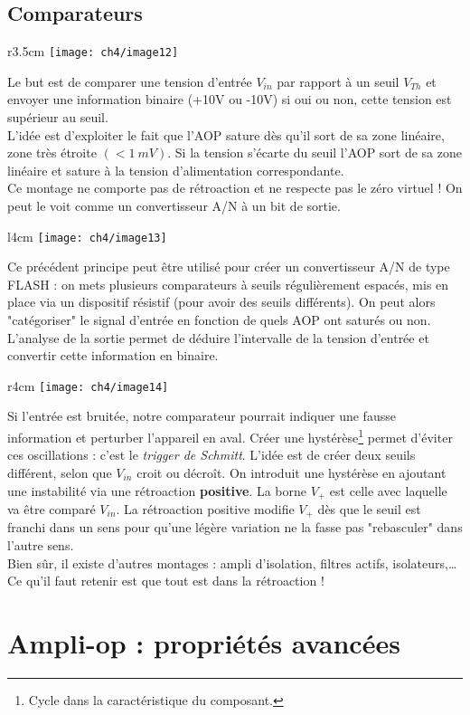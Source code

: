 	\subsection{Comparateurs}
	\begin{wrapfigure}[9]{r}{3.5cm}
	\vspace{-0.5cm}
	\texttt{[image: ch4/image12]}
	\end{wrapfigure}
	Le but est de comparer une tension d'entrée $V_{in}$ par rapport à
	un seuil $V_{Th}$ et envoyer une information binaire (+10V ou -10V) 
	si oui ou non, cette tension est supérieur au seuil. \\
	L'idée est d'exploiter le fait que l'AOP sature dès qu'il sort de sa zone 
	linéaire, zone très étroite $(<1\ mV)$. Si la tension s'écarte du seuil 
	l'AOP sort de sa zone linéaire et sature à la tension d'alimentation 
	correspondante.\\
	\danger Ce montage ne comporte pas de rétroaction et ne respecte pas le 
	zéro virtuel ! On peut le voit comme un convertisseur A/N à un bit de 
	sortie.\\

	\begin{wrapfigure}[9]{l}{4cm}
	\vspace{-0.98cm}
	\texttt{[image: ch4/image13]}
	\end{wrapfigure}	
	Ce précédent principe peut être utilisé pour créer un convertisseur A/N 
	de type FLASH : on mets plusieurs comparateurs à seuils régulièrement 
	espacés, mis en place via un dispositif résistif (pour avoir des seuils 
	différents). On peut alors "catégoriser" le signal d'entrée en fonction 
	de quels AOP ont saturés ou non. L'analyse de la sortie permet de déduire 
	l'intervalle de la tension d'entrée et convertir cette information en 
	binaire.\\

	\begin{wrapfigure}[6]{r}{4cm}
	\vspace{-0.98cm}
	\texttt{[image: ch4/image14]}
	\end{wrapfigure}		
	Si l'entrée est bruitée, notre comparateur pourrait indiquer une fausse 
	information et perturber l'appareil en aval. Créer une hystérèse\footnote{
	Cycle dans la caractéristique du composant.} permet d'éviter ces 
	oscillations : c'est le \textit{trigger de Schmitt}. L'idée est de créer 
	deux seuils différent, selon que $V_{in}$ croit ou décroît. On introduit 
	une hystérèse en ajoutant une instabilité via une rétroaction 
	\textbf{positive}. La borne $V_+$ est celle avec laquelle va être comparé 
	$V_{in}$. La rétroaction positive modifie $V_+$ dès que le seuil est 
	franchi dans un sens pour qu'une légère variation ne la fasse pas 
	"rebasculer" dans l'autre sens.\\
	
	Bien sûr, il existe d'autres montages : ampli d'isolation, filtres actifs, 
	isolateurs,\dots Ce qu'il faut retenir est que tout est dans la 
	rétroaction !
	
	
\section{Ampli-op : propriétés avancées}
